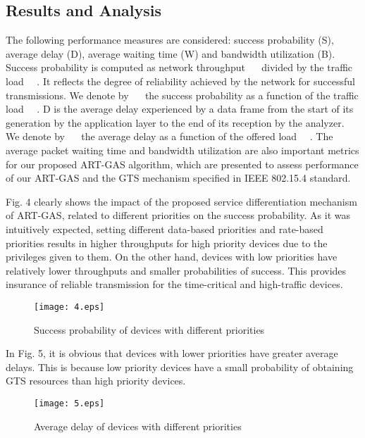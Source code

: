 \documentclass[letterpaper]{sig-alternate-10pt}
\begin{document}
\subsection{Results and Analysis}
The following performance measures are considered: success probability (S), average delay (D), average waiting time (W) and bandwidth utilization (B). Success probability is computed as network throughput ~~ divided by the traffic load ~~. It reflects the degree of reliability achieved by the network for successful transmissions. We denote by ~~ the success probability as a function of the traffic load ~~. D is the average delay experienced by a data frame from the start of its generation by the application layer to the end of its reception by the analyzer. We denote by ~~ the average delay as a function of the offered load ~~. The average packet waiting time and bandwidth utilization are also important metrics for our proposed ART-GAS algorithm, which are presented to assess performance of our ART-GAS and the GTS mechanism specified in IEEE 802.15.4 standard.

Fig. 4 clearly shows the impact of the proposed service differentiation mechanism of ART-GAS, related to different priorities on the success probability. As it was intuitively expected, setting different data-based priorities and rate-based priorities results in higher throughputs for high priority devices due to the privileges given to them. On the other hand, devices with low priorities have relatively lower throughputs and smaller probabilities of success. This provides insurance of reliable transmission for the time-critical and high-traffic devices.

\begin{figure}[!t]
\renewcommand{\captionfont}{\bfseries}
\centering
\texttt{[image: 4.eps]}
\centering
\caption{Success probability of devices with different priorities}
\label{fig_sim}
\end{figure}

In Fig. 5, it is obvious that devices with lower priorities have greater average delays. This is because low priority devices have a small probability of obtaining GTS resources than high priority devices.

\begin{figure}[!t]
\renewcommand{\captionfont}{\bfseries}
\centering
\texttt{[image: 5.eps]}
\centering
\caption{Average delay of devices with different priorities}
\label{fig_sim}
\end{figure}
\end{document}
